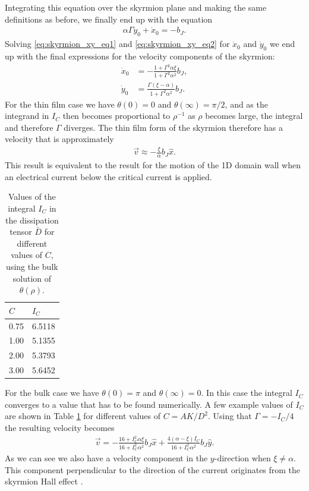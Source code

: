 \documentclass[12pt, a4paper]{article}		%
\numberwithin{equation}{section}
\begin{document}
Integrating this equation over the skyrmion plane and making the same definitions as before, we finally end up with the equation
\begin{align}
\label{eq:skyrmion_xy_eq2}
\alpha\Gamma\dot{y}_0 + \dot{x}_0 = -b_J.
\end{align}
Solving \eqref{eq:skyrmion_xy_eq1} and \eqref{eq:skyrmion_xy_eq2} for $\dot{x}_0$ and $\dot{y}_0$ we end up with the final expressions for the velocity components of the skyrmion:
\begin{align}
\dot{x}_0 &= -\frac{1+\Gamma^2\alpha\xi}{1+\Gamma^2\alpha^2}b_J, \label{eq:skyrmion_xdot} \\
\dot{y}_0 &= \frac{\Gamma(\xi-\alpha)}{1+\Gamma^2\alpha^2}b_J. \label{eq:skyrmion_ydot}
\end{align}
For the thin film case we have $\theta(0) = 0$ and $\theta(\infty)=\pi/2$, and as the integrand in $I_C$ then becomes proportional to $\rho^{-1}$ as $\rho$ becomes large, the integral and therefore $\Gamma$ diverges. The thin film form of the skyrmion therefore has a velocity that is approximately
\begin{align}
\vec{v} \approx -\frac{\xi}{\alpha}b_J\hat{x}.
\end{align}
This result is equivalent to the result for the motion of the 1D domain wall when an electrical current below the critical current is applied.\\
\begin{table}[h!]
	\centering
		\caption{Values of the integral $I_C$ in the dissipation tensor $\bar{D}$ for different values of $C$, using the bulk solution of $\theta(\rho)$.} 
	\begin{tabular}{l l} \hline
	$C$ & $I_C$\\ \hline
	0.75  & 6.5118\\
 	1.00  & 5.1355\\
 	2.00  & 5.3793 \\ 
 	3.00  & 5.6452 \\ \hline
	\end{tabular}
	\label{tab:C_I}
\end{table}

For the bulk case we have $\theta(0) = \pi$ and $\theta(\infty) = 0$. In this case the integral $I_C$ converges to a value that has to be found numerically. A few example values of $I_C$ are shown in Table \ref{tab:C_I} for different values of $C = AK/D^2$. Using that $\Gamma = -I_C/4$ the resulting velocity becomes
\begin{align}
\vec{v} = -\frac{16+I_C^2\alpha\xi}{16+I_C^2\alpha^2}b_J\hat{x} + \frac{4(\alpha-\xi)I_C}{16+I_C^2\alpha^2}b_J\hat{y}.
\end{align}
As we can see we also have a velocity component in the $y$-direction when $\xi\neq\alpha$. This component perpendicular to the direction of the current originates from the skyrmion Hall effect \cite{Nagaosa2013}.
\end{document}
